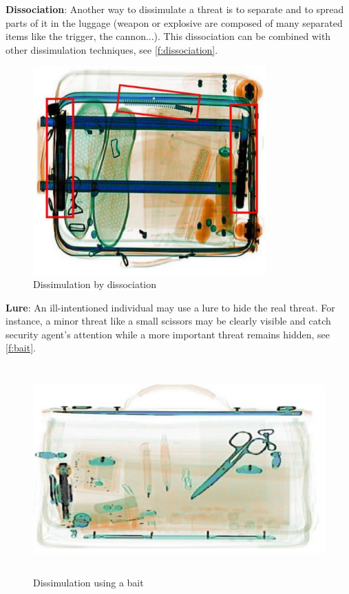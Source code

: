 \textbf{Dissociation}: Another way to dissimulate a threat is to separate and to spread parts of it in the luggage (weapon or explosive are composed of many separated items like the trigger, the cannon...). This dissociation can be combined with other dissimulation techniques,  see  \autoref{f:dissociation}.
\begin{figure}
\centering
	\includegraphics[width=0.8\textwidth]{Figures/Dissociation}
	\caption{Dissimulation by dissociation}
	\label{f:dissociation}
\end{figure}

\textbf{Lure}: An ill-intentioned individual may use a lure to hide the real threat. For instance, a minor threat like a small scissors may be clearly visible and catch security agent's attention while a more important threat remains hidden, see  \autoref{f:bait}.
\begin{figure}
\centering
	\includegraphics[height=8cm]{Figures/bait}
	\caption{Dissimulation using a bait}
	\label{f:bait}
\end{figure}

